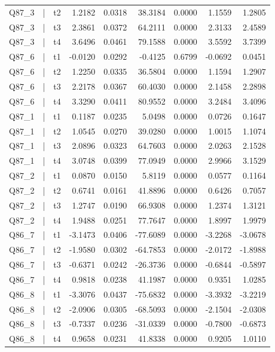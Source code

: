 \begin{longtable}{lllrrrrrr}
\addlinespace
Q87\_3 & | & t2 & 1.2182 & 0.0318 & 38.3184 & 0.0000 & 1.1559 & 1.2805\\
Q87\_3 & | & t3 & 2.3861 & 0.0372 & 64.2111 & 0.0000 & 2.3133 & 2.4589\\
Q87\_3 & | & t4 & 3.6496 & 0.0461 & 79.1588 & 0.0000 & 3.5592 & 3.7399\\
Q87\_6 & | & t1 & -0.0120 & 0.0292 & -0.4125 & 0.6799 & -0.0692 & 0.0451\\
Q87\_6 & | & t2 & 1.2250 & 0.0335 & 36.5804 & 0.0000 & 1.1594 & 1.2907\\
\addlinespace
Q87\_6 & | & t3 & 2.2178 & 0.0367 & 60.4030 & 0.0000 & 2.1458 & 2.2898\\
Q87\_6 & | & t4 & 3.3290 & 0.0411 & 80.9552 & 0.0000 & 3.2484 & 3.4096\\
Q87\_1 & | & t1 & 0.1187 & 0.0235 & 5.0498 & 0.0000 & 0.0726 & 0.1647\\
Q87\_1 & | & t2 & 1.0545 & 0.0270 & 39.0280 & 0.0000 & 1.0015 & 1.1074\\
Q87\_1 & | & t3 & 2.0896 & 0.0323 & 64.7603 & 0.0000 & 2.0263 & 2.1528\\
\addlinespace
Q87\_1 & | & t4 & 3.0748 & 0.0399 & 77.0949 & 0.0000 & 2.9966 & 3.1529\\
Q87\_2 & | & t1 & 0.0870 & 0.0150 & 5.8119 & 0.0000 & 0.0577 & 0.1164\\
Q87\_2 & | & t2 & 0.6741 & 0.0161 & 41.8896 & 0.0000 & 0.6426 & 0.7057\\
Q87\_2 & | & t3 & 1.2747 & 0.0190 & 66.9308 & 0.0000 & 1.2374 & 1.3121\\
Q87\_2 & | & t4 & 1.9488 & 0.0251 & 77.7647 & 0.0000 & 1.8997 & 1.9979\\
\addlinespace
Q86\_7 & | & t1 & -3.1473 & 0.0406 & -77.6089 & 0.0000 & -3.2268 & -3.0678\\
Q86\_7 & | & t2 & -1.9580 & 0.0302 & -64.7853 & 0.0000 & -2.0172 & -1.8988\\
Q86\_7 & | & t3 & -0.6371 & 0.0242 & -26.3736 & 0.0000 & -0.6844 & -0.5897\\
Q86\_7 & | & t4 & 0.9818 & 0.0238 & 41.1987 & 0.0000 & 0.9351 & 1.0285\\
Q86\_8 & | & t1 & -3.3076 & 0.0437 & -75.6832 & 0.0000 & -3.3932 & -3.2219\\
\addlinespace
Q86\_8 & | & t2 & -2.0906 & 0.0305 & -68.5093 & 0.0000 & -2.1504 & -2.0308\\
Q86\_8 & | & t3 & -0.7337 & 0.0236 & -31.0339 & 0.0000 & -0.7800 & -0.6873\\
Q86\_8 & | & t4 & 0.9658 & 0.0231 & 41.8338 & 0.0000 & 0.9205 & 1.0110\\

\end{longtable}

